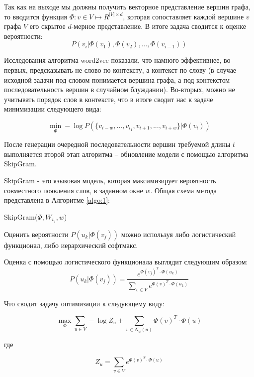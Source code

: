 Так как на выходе мы должны получить векторное представление вершин графа, то вводится функция $\Phi: v \in V \mapsto R^{|V| \times d} $, которая сопоставляет каждой вершине $v$ графа $V$ его скрытое $d$-мерное представление. В итоге задача сводится к оценке вероятности:
$$P(v_i|\Phi(v_1), \Phi(v_2), ..., \Phi(v_{i-1}))$$



Исследования алгоритма word2vec показали, что намного эффективнее, во-первых, предсказывать не слово по контексту, а контекст по слову (в случае исходной задачи под словом понимается вершина графа, а под контекстом последовательность вершин в случайном блуждании).  Во-вторых, можно не учитывать порядок слов в контексте, что в итоге сводит нас к задаче минимизации следующего вида:

$$\min_{\Phi} -\log P(\{v_{i-w}, ..., v_{i_1}, v_{i+1}, ..., v_{i+w}\} | \Phi (v_i))$$

После генерации очередной последовательности вершин требуемой длины $t$ выполняется второй этап алгоритма -- обновление модели с помощью алгоритма SkipGram.

SkipGram - это языковая модель, которая максимизирует вероятность совместного появления слов, в заданном  окне $w$. Общая схема метода представлена в Алгоритме \ref{algo:1}:

\begin{algorithm}[H]

    \caption{SkipGram($\Phi, W_{v_i}, w$)}
    \label{algo:1}
\end{algorithm}

Оценить вероятности $P(u_k | \Phi(v_j))$  можно используя либо логистический функционал, либо иерархический софтмакс. 

Оценка с помощью логистического функционала выглядит следующим образом:
$$P(u_k | \Phi(v_j)) = \frac{e^{\Phi(v_j)^T \cdot \Phi(u_k)}}{\sum_{v \in V} e^{\Phi(v)^T \cdot \Phi(u_k)}}$$

Что сводит задачу оптимизации к следующему виду:

$$
\max_{\Phi} \sum_{u \in V} -\log Z_u + \sum_{v \in N_w(u)} \Phi(v)^T \cdot \Phi(u)
$$

где 

\begin{equation} \label{Z_u}
Z_u = \sum_{v \in V} e^{ \Phi(v)^T \cdot \Phi(u)}
\end{equation}

